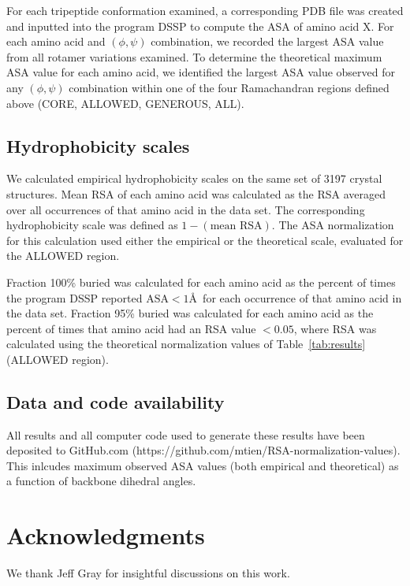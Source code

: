 \documentclass[11pt]{article}
\begin{document}
For each tripeptide conformation examined, a corresponding PDB file was created and inputted into the program DSSP \cite{Kabsch1983} to compute the ASA of amino acid X. For each amino acid and $(\phi, \psi)$ combination, we recorded the largest ASA value from all rotamer variations examined. To determine the theoretical maximum ASA value for each amino acid, we identified the largest ASA value observed for any $(\phi, \psi)$ combination within one of the four Ramachandran regions defined above (CORE, ALLOWED, GENEROUS, ALL).

\subsection*{Hydrophobicity scales}

We calculated empirical hydrophobicity scales on the same set of 3197 crystal structures. Mean RSA of each amino acid was calculated as the RSA averaged over all occurrences of that amino acid in the data set. The corresponding hydrophobicity scale was defined as $1-(\text{mean RSA})$. The ASA normalization for this calculation used either the empirical or the theoretical scale, evaluated for the ALLOWED region.

Fraction 100\% buried was calculated for each amino acid as the percent of times the program DSSP reported $\text{ASA}<1$\AA\ for each occurrence of that amino acid in the data set. Fraction 95\% buried was calculated for each amino acid as the percent of times that amino acid had an RSA value $<0.05$, where RSA was calculated using the theoretical normalization values of Table~\ref{tab:results} (ALLOWED region).

\subsection*{Data and code availability}
All results and all computer code used to generate these results have been deposited to GitHub.com (https://github.com/mtien/RSA-normalization-values). This inlcudes maximum observed ASA values (both empirical and theoretical) as a function of backbone dihedral angles.

\section*{Acknowledgments}
We thank Jeff Gray for insightful discussions on this work.


%
\end{document}
